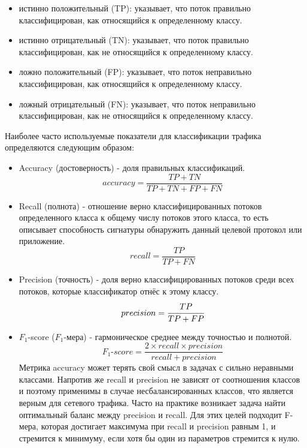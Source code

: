 \begin{itemize}
    \item истинно положительный (TP): указывает, что поток правильно классифицирован, как относящийся к определенному классу.
    \item истинно отрицательный (TN): указывает, что поток правильно классифицирован, как не относящийся к определенному классу.
    \item ложно положительный (FP): указывает, что поток неправильно классифицирован, как относящийся к определенному классу.
    \item ложный отрицательный (FN): указывает, что поток неправильно классифицирован, как не относящийся к определенному классу.
\end{itemize}

Наиболее часто используемые показатели для классификации трафика определяются следующим образом:

\begin{itemize}
    \item Accuracy (достоверность) - доля правильных классификаций.
    $$ accuracy = \dfrac{TP + TN}{TP + TN + FP + FN} $$

    \item Recall (полнота) - отношение верно классифицированных потоков определенного класса к общему числу потоков этого класса,
    то есть описывает способность сигнатуры обнаружить данный целевой протокол или приложение.
    $$ recall = \dfrac{TP}{TP + FN} $$

    \item Precision (точность) - доля верно классифицированных потоков среди всех потоков, которые классификатор отнёс к этому классу.
    $$ precision = \cfrac{TP}{TP + FP} $$

    \item $F_1$-score ($F_1$-мера) - гармоническое среднее между точностью и полнотой.
     $$ \textit{$F_1$-score} = \dfrac{2 \times recall \times precision}{recall + precision} $$
    Метрика accuracy может терять свой смысл в задачах с сильно неравными классами.
    Напротив же recall и precision не зависят от соотношения классов и поэтому применимы в случае несбалансированных классов,
    что является верным для сетевого трафика. Часто на практике возникает задача найти оптимальный баланс между precision
    и recall. Для этих целей подходит F-мера, которая достигает максимума при recall
    и precision равным 1, и стремится к минимуму, если хотя бы один из параметров стремится к нулю.

\end{itemize}

